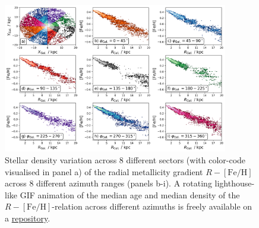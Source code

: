 \documentclass[fleqn,usenatbib]{mnras}
\begin{document}

\begin{figure}
    \centering
    \includegraphics[width=0.875\textwidth]{figures/radial_metallicity_gradients_mw_in_angles.png}
    \caption{Stellar density variation across 8 different sectors (with color-code visualised in panel a) of the radial metallicity gradient $R-\mathrm{[Fe/H]}$ across 8 different azimuth ranges (panels b-i). A rotating lighthouse-like GIF animation of the median age and median density of the $R-\mathrm{[Fe/H]}$-relation across different azimuths is freely available on a \href{https://github.com/svenbuder/nihao_radial_metallicity_gradients/blob/main/figures/xyz_rfeh.gif}{repository}.}
    \label{fig:radial_metallicity_gradients_mw_in_angles}
\end{figure}
\end{document}

